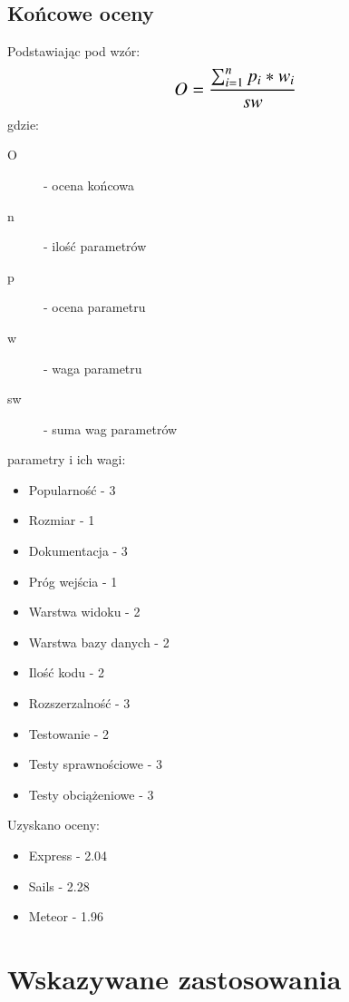 \documentclass[12pt]{report}
\begin{document}
    \subsection{Końcowe oceny}
      Podstawiając pod wzór:
      \newline
      \[\text{\Large$O = \frac{\sum_{i=1}^{n} p_{i} * w_{i}}{sw}$}\]
      \newline
      gdzie:
      \begin{description}
        \item[O] - ocena końcowa
        \item[n] - ilość parametrów
        \item[p] - ocena parametru
        \item[w] - waga parametru
        \item[sw] - suma wag parametrów
      \end{description}
      parametry i ich wagi:
      \begin{itemize}
        \item Popularność - 3
        \item Rozmiar - 1
        \item Dokumentacja - 3
        \item Próg wejścia - 1
        \item Warstwa widoku - 2
        \item Warstwa bazy danych - 2
        \item Ilość kodu - 2
        \item Rozszerzalność - 3
        \item Testowanie - 2
        \item Testy sprawnościowe - 3
        \item Testy obciążeniowe - 3
      \end{itemize}
      Uzyskano oceny:

      \begin{itemize}
        \item Express - 2.04
        \item Sails - 2.28
        \item Meteor - 1.96
      \end{itemize}

  \section{Wskazywane zastosowania}
\end{document}
